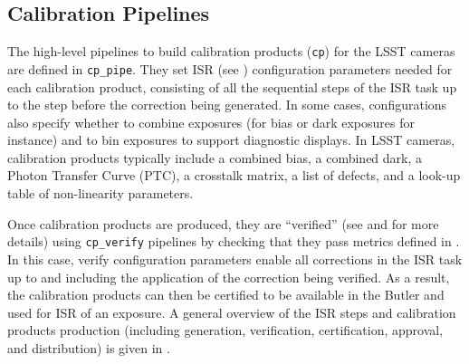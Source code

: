 \subsection{Calibration Pipelines}
\label{sec:calib_pipe}

The high-level pipelines to build calibration products (\texttt{cp}) for the LSST cameras are defined in \texttt{cp\_pipe}.
They set ISR (see ) configuration parameters needed for each calibration product, consisting of all the sequential steps of the ISR task up to the step before the correction being generated.
In some cases, configurations also specify whether to combine exposures (for bias or dark exposures for instance) and to bin exposures to support diagnostic displays.
In LSST cameras, calibration products typically include a combined bias, a combined dark, a Photon Transfer Curve (PTC), a crosstalk matrix, a list of defects, and a look-up table of non-linearity parameters.

Once calibration products are produced, they are ``verified'' (see \citet{DMTN-222} and \citet{SITCOMTN-086} for more details) using \texttt{cp\_verify} pipelines by checking that they pass metrics defined in \citet{DMTN-101}.
In this case, verify configuration parameters enable all corrections in the ISR task up to and including the application of the correction being verified.
As a result, the calibration products can then be certified to be available in the Butler and used for ISR of an exposure.
A general overview of the ISR steps and calibration products production (including generation, verification, certification, approval, and distribution) is given in \citet{2025JATIS..11a1209P}.

